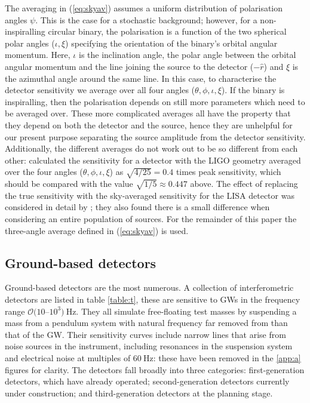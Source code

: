 The averaging in (\ref{eq:skyav}) assumes a uniform distribution of polarisation angles $\psi$. This is the case for a stochastic background; however, for a non-inspiralling circular binary, the polarisation is a function of the two spherical polar angles ($\iota,\xi$) specifying the orientation of the binary's orbital angular momentum. Here, $\iota$ is the inclination angle, the polar angle between the orbital angular momentum and the line joining the source to the detector ($-\hat{r}$) and $\xi$ is the azimuthal angle around the same line. In this case, to characterise the detector sensitivity we average over all four angles ($\theta,\phi,\iota,\xi$). If the binary is inspiralling, then the polarisation depends on still more parameters which need to be averaged over. These more complicated averages all have the property that they depend on both the detector and the source, hence they are unhelpful for our present purpose separating the source amplitude from the detector sensitivity. Additionally, the different averages do not work out to be so different from each other: \citet{1993PhRvD..47.2198F} calculated the sensitivity for a detector with the LIGO geometry averaged over the four angles ($\theta,\phi,\iota,\xi$) as $\sqrt{4/25}=0.4$ times peak sensitivity, which should be compared with the value $\sqrt{1/5}\approx 0.447$ above. The effect of replacing the true sensitivity with the sky-averaged sensitivity for the LISA detector was considered in detail by \cite{2012CQGra..29l4015V}; they also found there is a small difference when considering an entire population of sources. For the remainder of this paper the three-angle average defined in (\ref{eq:skyav}) is used.

\subsection{Ground-based detectors}\label{sec:ground}

Ground-based detectors are the most numerous. A collection of interferometric detectors are listed in table \ref{table:t}, these are sensitive to GWs in the frequency range ${\mathcal{O}}(10$--$10^{3})~\mathrm{Hz}$. They all simulate free-floating test masses by suspending a mass from a pendulum system with natural frequency far removed from than that of the GW. Their sensitivity curves include narrow lines that arise from noise sources in the instrument, including resonances in the suspension system and electrical noise at multiples of $60~\mathrm{Hz}$: these have been removed in the \ref{app:a} figures for clarity. The detectors fall broadly into three categories: first-generation detectors, which have already operated; second-generation detectors currently under construction; and third-generation detectors at the planning stage. 

